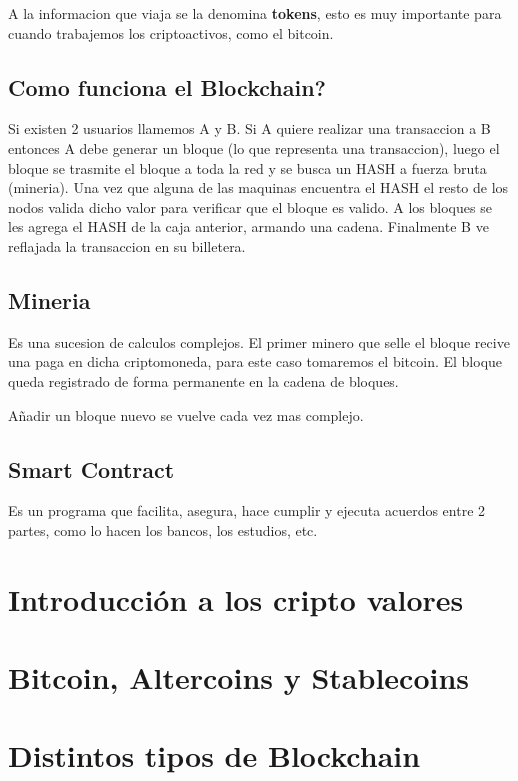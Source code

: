 \documentclass[]{book}
\begin{document}
    A la informacion que viaja se la denomina \textbf{tokens}, esto es muy importante para cuando 
    trabajemos los criptoactivos, como el bitcoin.

    \section{Como funciona el Blockchain?}

    Si existen 2 usuarios llamemos A y B. Si A quiere realizar una transaccion a B
    entonces A debe generar un bloque (lo que representa una transaccion), luego el 
    bloque se trasmite el bloque a toda la red y se busca un HASH a fuerza bruta 
    (mineria). Una vez que alguna de las maquinas encuentra el HASH 
    el resto de los nodos valida dicho valor para verificar que el bloque es valido.
    A los bloques se les agrega el HASH de la caja anterior, armando una cadena. Finalmente 
    B ve reflajada la transaccion en su billetera.

    \section{Mineria}

    Es una sucesion de calculos complejos. El primer minero que selle el bloque 
    recive una paga en dicha criptomoneda, para este caso tomaremos el bitcoin.
    El bloque queda registrado de forma permanente en la cadena de bloques.
    
    Añadir un bloque nuevo se vuelve cada vez mas complejo.

    \section{Smart Contract}

    Es un programa que facilita, asegura, hace cumplir y ejecuta acuerdos entre 2 partes, como 
    lo hacen los bancos, los estudios, etc.

    

    \chapter{ Introducción a los cripto valores }
    \chapter{ Bitcoin, Altercoins y Stablecoins }
    \chapter{ Distintos tipos de Blockchain }
\end{document}
